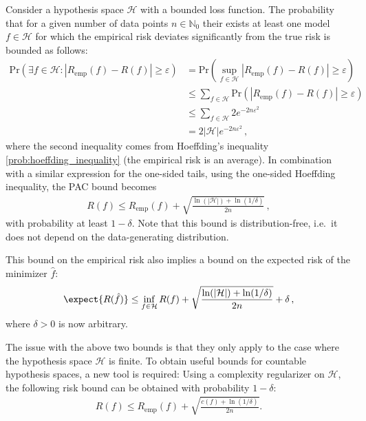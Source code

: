     \begin{property}
        Consider a hypothesis space $\mathcal{H}$ with a bounded loss function. The probability that for a given number of data points $n\in\mathbb{N}_0$ their exists at least one model $f\in\mathcal{H}$ for which the empirical risk deviates significantly from the true risk is bounded as follows:
        \begin{align}
            \mathrm{Pr}(\exists f\in\mathcal{H}:|R_\mathrm{emp}(f)-R(f)|\geq\varepsilon) &= \mathrm{Pr}(\sup_{f\in\mathcal{H}}|R_\mathrm{emp}(f)-R(f)|\geq\varepsilon)\nonumber\\
            &\leq\sum_{f\in\mathcal{H}}\mathrm{Pr}(|R_\mathrm{emp}(f)-R(f)|\geq\varepsilon)\nonumber\\
            &\leq\sum_{f\in\mathcal{H}}2e^{-2n\varepsilon^2}\nonumber\\
            &=2|\mathcal{H}|e^{-2n\varepsilon^2}\,,
        \end{align}
        where the second inequality comes from Hoeffding's inequality \ref{prob:hoeffding_inequality} (the empirical risk is an average). In combination with a similar expression for the one-sided tails, using the one-sided Hoeffding inequality, the PAC bound becomes
        \begin{gather}
            R(f)\leq R_\mathrm{emp}(f) + \sqrt{\frac{\ln(|\mathcal{H}|)+\ln(1/\delta)}{2n}}\,,
        \end{gather}
        with probability at least $1-\delta$. Note that this bound is distribution-free, i.e.~it does not depend on the data-generating distribution.

        This bound on the empirical risk also implies a bound on the expected risk of the minimizer $\hat{f}$:
        \begin{gather}
            \expect{R(\hat{f})}\leq\inf_{f\in\mathcal{H}}R(f)+\sqrt{\frac{\ln(|\mathcal{H}|)+\ln(1/\delta)}{2n}}+\delta\,,
        \end{gather}
        where $\delta>0$ is now arbitrary.
    \end{property}

    The issue with the above two bounds is that they only apply to the case where the hypothesis space $\mathcal{H}$ is finite. To obtain useful bounds for countable hypothesis spaces, a new tool is required:
    Using a complexity regularizer on $\mathcal{H}$, the following risk bound can be obtained with probability $1-\delta$:
    \begin{gather}
        R(f)\leq R_\mathrm{emp}(f) + \sqrt{\frac{c(f)+\ln(1/\delta)}{2n}}.
    \end{gather}


